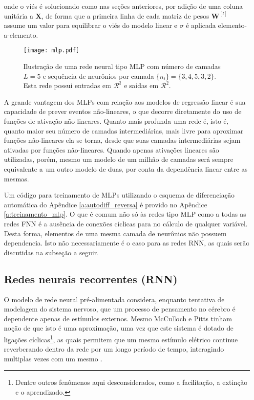     \noindent onde o viés é solucionado como nas seções anteriores, por adição de uma coluna unitária a $\boldsymbol{X}$, de forma que a primeira linha de cada matriz de pesos $\boldsymbol{W}^{[l]}$ assume um valor para equilibrar o viés do modelo linear e $\sigma$ é aplicada elemento-a-elemento.

    \begin{figure}
      \begin{center}
        \texttt{[image: mlp.pdf]}
      \end{center}
      \caption{Ilustração de uma rede neural tipo MLP com \DIFdelbeginFL {}\DIFdelendFL número de camadas $L=5$ e sequência de neurônios por camada $\{n_l\} = \{3,4,5,3,2\}$. Esta rede possui entradas em $\mathcal{R}^{3}$ e saídas em $\mathcal{R}^{2}$.}
      \label{f:mlp}
    \end{figure}

    A grande vantagem dos MLPs com relação aos modelos de regressão linear é sua capacidade de prever eventos não-lineares, o que decorre diretamente do uso de funções de ativação não-lineares. Quanto mais profunda uma rede é, isto é, quanto maior seu número de camadas intermediárias, mais livre para aproximar funções não-lineares ela se torna, desde que suas camadas intermediárias sejam ativadas por funções não-lineares. Quando apenas ativações lineares são utilizadas, porém, mesmo um modelo de um milhão de camadas será sempre equivalente a um outro modelo de duas, por conta da dependência linear entre as mesmas.

    Um código para treinamento de MLPs utilizando o esquema de diferenciação automática do Apêndice \ref{a:autodiff_reversa} é provido no Apêndice \ref{a:treinamento_mlp}. O que é comum não só às redes tipo MLP como a todas as redes FNN é a ausência de conexões cíclicas para no cálculo de qualquer variável. Desta forma, elementos de uma mesma camada de neurônios não possuem dependencia. Isto não necessariamente é o caso para as redes RNN, as quais serão discutidas na subseção a seguir.

    \subsection{Redes neurais recorrentes (RNN)} \label{s:rnn}

      O modelo de rede neural pré-alimentada considera, enquanto tentativa de modelagem do sistema nervoso, que um processo de pensamento no cérebro é dependente apenas de estímulos externos. Mesmo McCulloch e Pitts \citeyear{mcculloch1943logical} tinham noção de que isto é uma aproximação, uma vez que este sistema é dotado de ligações cíclicas\footnote{Dentre outros fenômenos aqui desconsiderados, como a facilitação, a extinção e o aprendizado.}, as quais permitem que um mesmo estímulo elétrico continue reverberando dentro da rede por um longo período de tempo, interagindo multiplas vezes com um mesmo \DIFdelbegin {}\DIFdelend \DIFaddbegin {}\DIFaddend .

